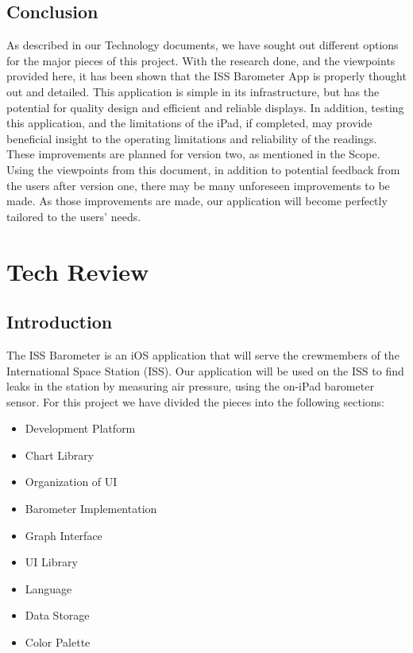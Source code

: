 \documentclass[onecolumn, draftclsnofoot,10pt, compsoc]{IEEEtran}
\def \CapstoneProjectName{ISS Barometer App }
\begin{document}
\subsection{Conclusion}
As described in our Technology documents, we have sought out different options for the major pieces of this project.
With the research done, and the viewpoints provided here, it has been shown that the \CapstoneProjectName is properly thought out and detailed.
This application is simple in its infrastructure, but has the potential for quality design and efficient and reliable displays.
In addition, testing this application, and the limitations of the iPad, if completed, may provide beneficial insight to the operating limitations and reliability of the readings.
These improvements are planned for version two, as mentioned in the Scope.
Using the viewpoints from this document, in addition to potential feedback from the users after version one, there may be many unforeseen improvements to be made.
As those improvements are made, our application will become perfectly tailored to the users' needs.



\newpage
\section{Tech Review}

\subsection{Introduction}
The ISS Barometer is an iOS application that will serve the crewmembers of the International Space Station (ISS).
Our application will be used on the ISS to find leaks in the station by measuring air pressure, using the on-iPad barometer sensor.
For this project we have divided the pieces into the following sections:

\begin{itemize}
\item Development Platform
\item Chart Library
\item Organization of UI
\item Barometer Implementation
\item Graph Interface
\item UI Library
\item Language
\item Data Storage
\item Color Palette
\end{itemize}
\end{document}
